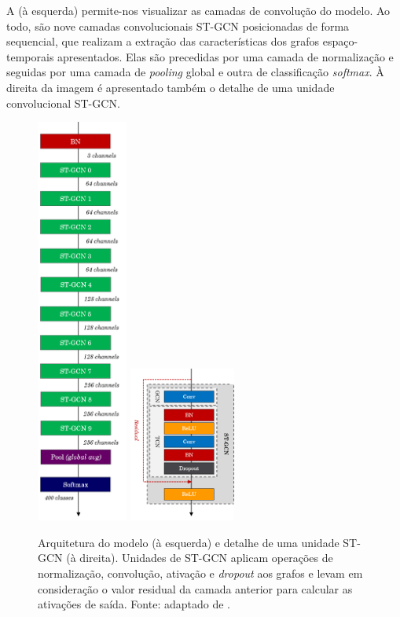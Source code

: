 
A  (à esquerda) permite-nos visualizar as camadas de convolução do modelo. Ao todo, são nove camadas convolucionais ST-GCN posicionadas de forma sequencial, que realizam a extração das características dos grafos espaço-temporais apresentados. Elas são precedidas por uma camada de normalização e seguidas por uma camada de \textit{pooling} global e outra de classificação \textit{softmax}. À direita da imagem é apresentado também o detalhe de uma unidade convolucional ST-GCN.

\begin{figure}[ht]
    \centering
    \includegraphics[width=3.0cm]{images/st_gcn_architecture}
    \includegraphics[width=3.5cm]{images/st_gcn_architeture_unit}
    \caption{Arquitetura do modelo (à esquerda) e detalhe de uma unidade ST-GCN (à direita). Unidades de ST-GCN aplicam operações de normalização, convolução, ativação e \textit{dropout} aos grafos e levam em consideração o valor residual da camada anterior para calcular as ativações de saída. Fonte: adaptado de \cite{st-gcn-2018}.}
    \label{fig:st-gcn-architecture}
\end{figure}


